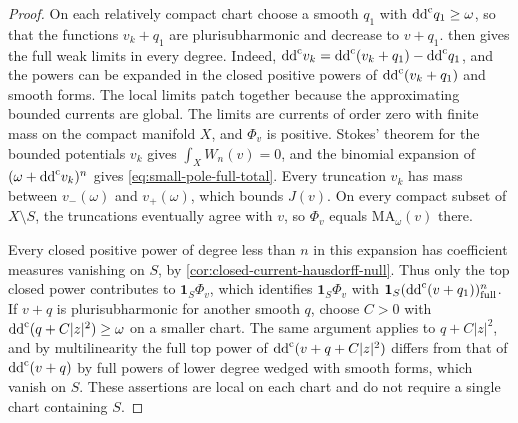 \begin{proof}
On each relatively compact chart choose a smooth $q_1$ with $\mathrm{dd}^{\mathrm{c}} q_1\geq\omega$, so that the functions $v_k+q_1$ are plurisubharmonic and decrease to $v+q_1$.  then gives the full weak limits in every degree. Indeed, $\mathrm{dd}^{\mathrm{c}} v_k=\mathrm{dd}^{\mathrm{c}}(v_k+q_1)-\mathrm{dd}^{\mathrm{c}} q_1$, and the powers can be expanded in the closed positive powers of $\mathrm{dd}^{\mathrm{c}}(v_k+q_1)$ and smooth forms. The local limits patch together because the approximating bounded currents are global. The limits are currents of order zero with finite mass on the compact manifold $X$, and $\Phi_v$ is positive. Stokes' theorem for the bounded potentials $v_k$ gives $\int_XW_n(v)=0$, and the binomial expansion of $(\omega+\mathrm{dd}^{\mathrm{c}} v_k)^n$ gives \eqref{eq:small-pole-full-total}. Every truncation $v_k$ has mass between $v_-(\omega)$ and $v_+(\omega)$, which bounds $J(v)$. On every compact subset of $X\setminus S$, the truncations eventually agree with $v$, so $\Phi_v$ equals $\mathrm{MA}_\omega(v)$ there.

Every closed positive power of degree less than $n$ in this expansion has coefficient measures vanishing on $S$, by \cref{cor:closed-current-hausdorff-null}. Thus only the top closed power contributes to $\mathbf1_S\Phi_v$, which identifies $\mathbf1_S\Phi_v$ with $\mathbf1_S(\mathrm{dd}^{\mathrm{c}}(v+q_1))^n_{\mathrm{full}}$. If $v+q$ is plurisubharmonic for another smooth $q$, choose $C>0$ with $\mathrm{dd}^{\mathrm{c}}(q+C|z|^2)\geq\omega$ on a smaller chart. The same argument applies to $q+C|z|^2$, and by multilinearity the full top power of $\mathrm{dd}^{\mathrm{c}}(v+q+C|z|^2)$ differs from that of $\mathrm{dd}^{\mathrm{c}}(v+q)$ by full powers of lower degree wedged with smooth forms, which vanish on $S$. These assertions are local on each chart and do not require a single chart containing $S$.
\end{proof}

